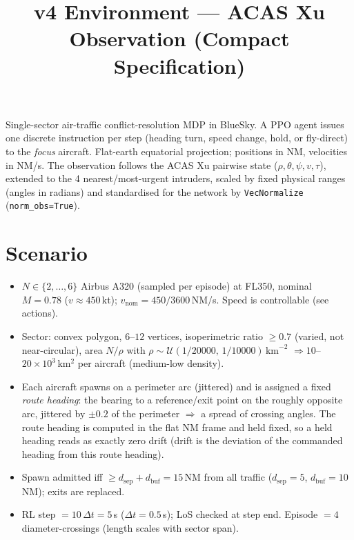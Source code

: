 \documentclass[11pt, a4paper]{article}
\title{\textbf{v4 Environment --- ACAS Xu Observation (Compact Specification)}}
\date{}
\begin{document}
\maketitle

Single-sector air-traffic conflict-resolution MDP in BlueSky. A PPO agent issues one
discrete instruction per step (heading turn, speed change, hold, or fly-direct) to the
\emph{focus} aircraft. Flat-earth equatorial projection; positions in NM, velocities in
NM/s. The observation follows the
ACAS Xu pairwise state ($\rho,\theta,\psi,v,\tau$), extended to the 4 nearest/most-urgent
intruders, scaled by fixed physical ranges (angles in radians) and standardised for the
network by \texttt{VecNormalize} (\texttt{norm\_obs=True}).

\section{Scenario}
\begin{itemize}\itemsep1pt
\item $N\in\{2,\dots,6\}$ Airbus A320 (sampled per episode) at FL350, nominal $M=0.78$
      ($v\approx450$\,kt); $v_\text{nom}=450/3600$\,NM/s. Speed is controllable (see actions).
\item Sector: convex polygon, $6$--$12$ vertices, isoperimetric ratio $\ge 0.7$ (varied, not near-circular),
      area $N/\rho$ with $\rho\sim\mathcal U(1/20000,\,1/10000)\,\text{km}^{-2}$
      $\Rightarrow 10$--$20\times10^3$\,km$^2$ per aircraft (medium-low density).
\item Each aircraft spawns on a perimeter arc (jittered) and is assigned a fixed
      \emph{route heading}: the bearing to a reference/exit point on the roughly opposite arc,
      jittered by $\pm0.2$ of the perimeter $\Rightarrow$ a spread of crossing angles. The route
      heading is computed in the flat NM frame and held fixed, so a held heading reads as exactly
      zero drift (drift is the deviation of the commanded heading from this route heading).
\item Spawn admitted iff $\ge d_\text{sep}+d_\text{buf}=15$\,NM from all traffic
      ($d_\text{sep}=5$, $d_\text{buf}=10$\,NM); exits are replaced.
\item RL step $=10\,\Delta t=5$\,s ($\Delta t=0.5$\,s); LoS checked at step end.
      Episode $=4$ diameter-crossings (length scales with sector span).
\end{itemize}
\end{document}
